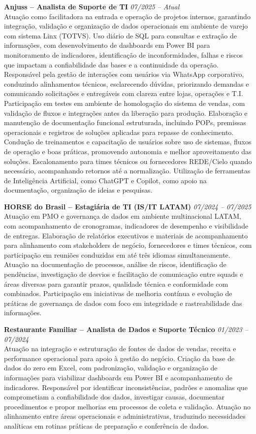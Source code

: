 \documentclass[11pt,a4paper]{article}
\newcommand{\experience}[3]{%
  \textbf{#1} \hfill \textit{#2}\\[4pt]
  #3
  \vspace{8pt}
}
\begin{document}
\experience{Anjuss -- Analista de Suporte de TI}{07/2025 -- Atual}{%
Atuação como facilitadora na entrada e operação de projetos internos, garantindo integração, validação e organização de dados operacionais em ambiente de varejo com sistema Linx (TOTVS). Uso diário de SQL para consultas e extração de informações, com desenvolvimento de dashboards em Power BI para monitoramento de indicadores, identificação de inconformidades, falhas e riscos que impactam a confiabilidade das bases e a continuidade da operação. Responsável pela gestão de interações com usuários via WhatsApp corporativo, conduzindo alinhamentos técnicos, esclarecendo dúvidas, priorizando demandas e comunicando solicitações e entregáveis com clareza entre lojas, operações e T.I. Participação em testes em ambiente de homologação do sistema de vendas, com validação de fluxos e integrações antes da liberação para produção. Elaboração e manutenção de documentação funcional estruturada, incluindo POPs, premissas operacionais e registros de soluções aplicadas para repasse de conhecimento. Condução de treinamentos e capacitação de usuários sobre uso de sistemas, fluxos de operação e boas práticas, promovendo autonomia e melhor aproveitamento das soluções. Escalonamento para times técnicos ou fornecedores REDE/Cielo quando necessário, acompanhando retornos até a normalização. Utilização de ferramentas de Inteligência Artificial, como ChatGPT e Copilot, como apoio na documentação, organização de ideias e pesquisas.}

\experience{HORSE do Brasil -- Estagiária de TI (IS/IT LATAM)}{07/2024 -- 07/2025}{%
Atuação em PMO e governança de dados em ambiente multinacional LATAM, com acompanhamento de cronogramas, indicadores de desempenho e visibilidade de entregas. Elaboração de relatórios executivos e materiais de acompanhamento para alinhamento com stakeholders de negócio, fornecedores e times técnicos, com participação em reuniões conduzidas em até três idiomas simultaneamente. Atuação na documentação de processos, análise de riscos, identificação de pendências, investigação de desvios e facilitação de comunicação entre squads e áreas diversas para garantir prazos, qualidade técnica e conformidade com combinados. Participação em iniciativas de melhoria contínua e evolução de práticas de governança de dados com foco em integridade e rastreabilidade das informações.}

\experience{Restaurante Familiar -- Analista de Dados e Suporte Técnico}{01/2023 -- 07/2024}{%
Atuação na integração e estruturação de fontes de dados de vendas, receita e performance operacional para apoio à gestão do negócio. Criação da base de dados do zero em Excel, com padronização, validação e organização de informações para viabilizar dashboards em Power BI e acompanhamento de indicadores. Responsável por identificar inconsistências, padrões e anomalias que comprometiam a confiabilidade dos dados, investigar causas, documentar procedimentos e propor melhorias em processos de coleta e validação. Atuação no alinhamento entre áreas operacionais e administrativas, traduzindo necessidades analíticas em rotinas práticas de preparação e conferência de dados.}
\end{document}
